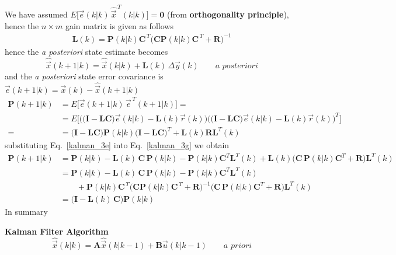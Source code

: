 \documentclass[12pt,a4paper,oneside]{book}
\begin{document}
\begin{onehalfspace}
We have assumed $E\Big[\vec{e}(k|k)\,\hat{\vec{x}}^{\,T}(k|k)\Big]=\mathbf{0}$ 
(from \textbf{orthogonality principle}), hence the $n\times m$ gain matrix is 
given as follows
\begin{equation}\label{kalman_3e}
	\begin{aligned}
		\mathbf{L}(k) = 
		\mathbf{P}(k|k)\mathbf{C}^{\,T}\Big(\mathbf{C}\mathbf{P}(k|k)\mathbf{C}^{\,T}+\mathbf{R}\Big)^{-1}
	\end{aligned}
\end{equation}
hence the \textit{a posteriori} state estimate becomes
\begin{equation}\label{kalman_3f}
	\hat{\vec{x}}\left(k+1|k\right) = \hat{\vec{x}}\left(k|k\right) + 
	\mathbf{L}(k)\, \Delta\vec{y}\left(k\right) \qquad \textit{a posteriori}
\end{equation}
and the \textit{a posteriori} state error covariance is 
$\vec{e}(k+1|k)=\vec{x}(k) - \hat{\vec{x}}(k+1|k)$
\begin{equation}\label{kalman_3g}
	\begin{aligned}
		\mathbf{P}\left(k+1|k\right) &= 
		E\Big[\vec{e}(k+1|k)\,\vec{e}^{\,T}(k+1|k)\Big] = \\[6pt] &= 
		E\Big[\Big(\Big(\mathbf{I}-\mathbf{LC}\Big)\vec{e}(k|k) - 
		\mathbf{L}(k)\vec{r}(k)\Big) 
		\Big(\Big(\mathbf{I}-\mathbf{LC}\Big)\vec{e}(k|k) - 
		\mathbf{L}(k)\vec{r}(k)\Big)^T\Big] \\[6pt] =
		&=  \Big(\mathbf{I}-\mathbf{LC}\Big)\mathbf{P}(k|k) 
		\Big(\mathbf{I}-\mathbf{LC}\Big)^T+\mathbf{L}(k)\mathbf{R}\mathbf{L}^T(k)
	\end{aligned}
\end{equation}
substituting Eq.~\eqref{kalman_3e} into Eq.~\eqref{kalman_3g} we obtain
\begin{equation}\label{kalman_3h}
	\begin{aligned}
		\mathbf{P}\left(k+1|k\right) &= \mathbf{P}\left(k|k\right) - 
		\mathbf{L}(k)\,\mathbf{C}\,\mathbf{P}(k|k) - 
		\mathbf{P}(k|k)\mathbf{C}^T\mathbf{L}^T(k)+\mathbf{L}(k) 
		\Big(\mathbf{C}\,\mathbf{P}(k|k)\mathbf{C}^T+ 
		\mathbf{R}\Big)\mathbf{L}^T(k)	 \\[6pt]
		&= \mathbf{P}\left(k|k\right) - 
		\mathbf{L}(k)\,\mathbf{C}\,\mathbf{P}(k|k) - 
		\mathbf{P}(k|k)\mathbf{C}^T\mathbf{L}^T(k) \\[6pt]
		& \qquad+\mathbf{P}(k|k)\mathbf{C}^{\,T} \Big(\mathbf{C} 
		\mathbf{P}(k|k)\mathbf{C}^{\,T}+ \mathbf{R}\Big)^{-1}
		\Big(\mathbf{C}\, \mathbf{P}(k|k)\mathbf{C}^T 
		+\mathbf{R}\Big)\mathbf{L}^T(k)  \\[6pt]
		& = \Big(\mathbf{I}-\mathbf{L}(k)\,\mathbf{C} \Big) 
		\mathbf{P}\left(k|k\right)
	\end{aligned}
\end{equation}
In summary
\begin{mybox}
	\noindent\textbf{Kalman Filter Algorithm}
	\begin{equation}\label{ks1}
		\hat{\vec{x}}\left(k|k\right) = \mathbf{A} 
		\hat{\vec{x}}\left(k|k-1\right) + \mathbf{B} \vec{u}\left(k|k-1\right) 
		\qquad \textit{a priori}
	\end{equation}
	

\end{mybox}
\end{onehalfspace}
\end{document}
